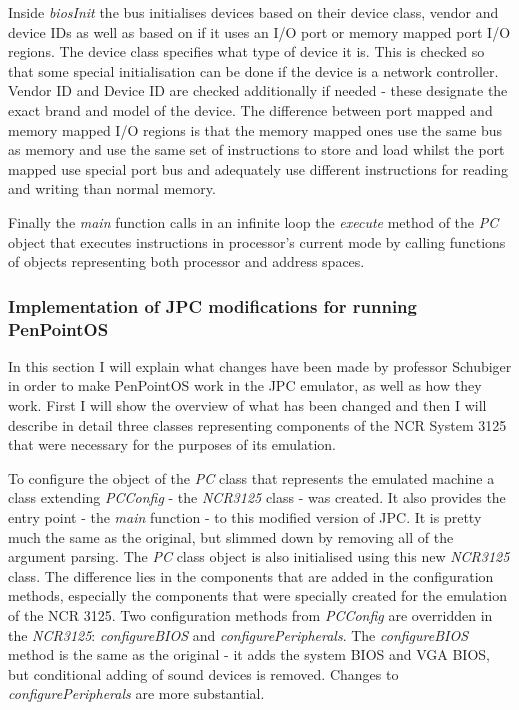 Inside \emph{biosInit} the bus initialises devices based on their device class,
vendor and device IDs as well as based on if it uses an I/O port or memory
mapped port I/O regions. The device class specifies what type of device it is.
This is checked so that some special initialisation can be done if the device
is a network controller. Vendor ID and Device ID are checked additionally if
needed - these designate the exact brand and model of the device. The
difference between port mapped and memory mapped I/O regions is that the memory
mapped ones use the same bus as memory and use the same set of instructions to
store and load whilst the port mapped use special port bus and adequately use
different instructions for reading and writing than normal memory.

Finally the \emph{main} function calls in an infinite loop the \emph{execute}
method of the \emph{PC} object that executes instructions in processor's
current mode by calling functions of objects representing both processor and
address spaces.

\subsubsection{Implementation of JPC modifications for running PenPointOS}

In this section I will explain what changes have been made by professor
Schubiger in order to make PenPointOS work in the JPC emulator, as well as how
they work. First I will show the overview of what has been changed and then
I will describe in detail three classes representing components of the NCR
System 3125 that were necessary for the purposes of its emulation.

To configure the object of the \emph{PC} class that represents the emulated
machine a class extending \emph{PCConfig} - the \emph{NCR3125} class -  was
created. It also provides the entry point - the \emph{main} function - to this
modified version of JPC. It is pretty much the same as the original, but
slimmed down by removing all of the argument parsing. The \emph{PC} class
object is also initialised using this new \emph{NCR3125} class. The difference
lies in the components that are added in the configuration methods, especially
the components that were specially created for the emulation of the NCR 3125.
Two configuration methods from \emph{PCConfig} are overridden in the
\emph{NCR3125}: \emph{configureBIOS} and \emph{configurePeripherals}. The
\emph{configureBIOS} method is the same as the original - it adds the system
BIOS and VGA BIOS, but conditional adding of sound devices is removed. Changes
to \emph{configurePeripherals} are more substantial.

